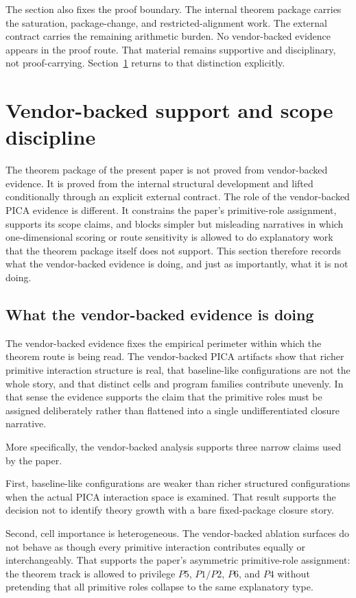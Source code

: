 \documentclass[11pt]{article}
\begin{document}
The section also fixes the proof boundary. The internal theorem package carries the saturation, package-change, and restricted-alignment work. The external contract carries the remaining arithmetic burden. No vendor-backed evidence appears in the proof route. That material remains supportive and disciplinary, not proof-carrying. Section~\ref{sec:vendor-support} returns to that distinction explicitly.
 \section{Vendor-backed support and scope discipline}\label{sec:vendor-support}

The theorem package of the present paper is not proved from vendor-backed
evidence. It is proved from the internal structural development and lifted
conditionally through an explicit external contract. The role of the
vendor-backed PICA evidence is different. It constrains the paper's
primitive-role assignment, supports its scope claims, and blocks simpler but
misleading narratives in which one-dimensional scoring or route sensitivity is
allowed to do explanatory work that the theorem package itself does not
support. This section therefore records what the vendor-backed evidence is
doing, and just as importantly, what it is not doing.

\subsection*{What the vendor-backed evidence is doing}

The vendor-backed evidence fixes the empirical perimeter within which the
theorem route is being read. The vendor-backed PICA artifacts show that richer
primitive interaction structure is real, that baseline-like configurations are
not the whole story, and that distinct cells and program families contribute
unevenly. In that sense the evidence supports the claim that the primitive roles
must be assigned deliberately rather than flattened into a single
undifferentiated closure narrative.

More specifically, the vendor-backed analysis supports three narrow claims used
by the paper.

First, baseline-like configurations are weaker than richer structured
configurations when the actual PICA interaction space is examined. That result
supports the decision not to identify theory growth with a bare fixed-package
closure story.

Second, cell importance is heterogeneous. The vendor-backed ablation surfaces do
not behave as though every primitive interaction contributes equally or
interchangeably. That supports the paper's asymmetric primitive-role assignment:
the theorem track is allowed to privilege \(P5\), \(P1/P2\), \(P6\), and \(P4\) without
pretending that all primitive roles collapse to the same explanatory type.
\end{document}

